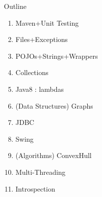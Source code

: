 \documentclass[English,t,%
hyperref={%
    pdftitle={FISA-DE2 OOP in Java},%
    pdfauthor={Guillaume Muller},%
    pdfsubject={OOP in Java},%
    pdfkeywords={OOP,Java}%
    },%
xcolor={pdftex,svgnames} %
]{beamer}
\begin{document}
\begin{frame}{Outline}

  \begin{enumerate}
    \item Maven+Unit Testing
    \item Files+Exceptions
    \item POJOs+Strings+Wrappers
    \item Collections
    \item Java8 : lambdas
    \item (Data Structures) Graphs
    \item JDBC
    \item Swing
    \item (Algorithms) ConvexHull
    \item Multi-Threading
    \item Introspection
  \end{enumerate}

\end{frame}
\end{document}
